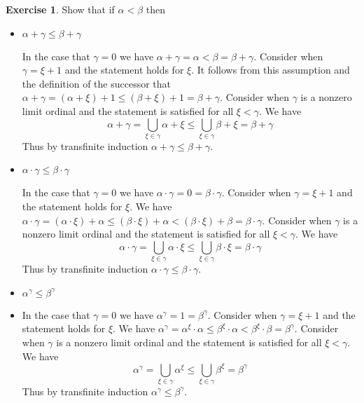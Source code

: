 \documentclass{article}
\theoremstyle{definition}
\newtheorem{exer}{Exercise}[section]
\newlength{\defparindent}
\newenvironment{answer}
    {\begin{mdframed}[backgroundcolor=gray!15, linewidth=0pt] \setlength{\parindent}{\defparindent}}
    {\end{mdframed}}
\begin{document}
\begin{exer}
    Show that if $\alpha < \beta$ then 
    \begin{itemize}
        \item $\alpha + \gamma \le \beta + \gamma$
        \begin{answer}
            In the case that $\gamma = 0$ we have $\alpha + \gamma = \alpha < \beta = \beta + \gamma$. Consider when $\gamma = \xi + 1$ and the statement holds for $\xi$. It follows from this assumption and the definition of the successor that $\alpha + \gamma = (\alpha + \xi) + 1 \le (\beta + \xi) + 1 = \beta + \gamma$. Consider when $\gamma$ is a nonzero limit ordinal and the statement is satisfied for all $\xi < \gamma$. We have 
            \[
                \alpha + \gamma = \bigcup_{\xi \in \gamma} \alpha + \xi 
                \le 
                \bigcup_{\xi \in \gamma} \beta + \xi
                =
                \beta + \gamma
            \]
            Thus by transfinite induction $\alpha + \gamma \le \beta + \gamma$.
        \end{answer}

        \item $\alpha \cdot \gamma \le \beta \cdot \gamma$
        \begin{answer}
            In the case that $\gamma = 0$ we have $\alpha \cdot \gamma = 0 = \beta \cdot \gamma$. Consider when $\gamma = \xi + 1$ and the statement holds for $\xi$. We have $\alpha \cdot \gamma = (\alpha \cdot \xi) + \alpha \le (\beta \cdot \xi) + \alpha < (\beta \cdot \xi) + \beta = \beta \cdot \gamma$. Consider when $\gamma$ is a nonzero limit ordinal and the statement is satisfied for all $\xi < \gamma$. We have 
            \[
                \alpha \cdot \gamma
                =
                \bigcup_{\xi \in \gamma} \alpha \cdot \xi 
                \le 
                \bigcup_{\xi \in \gamma} \beta \cdot \xi
                = 
                \beta \cdot \gamma
            \]
            Thus by transfinite induction $\alpha \cdot \gamma \le \beta \cdot \gamma$.
        \end{answer}

        \item $\alpha^\gamma \le \beta^\gamma$
        \item \begin{answer}
            In the case that $\gamma = 0$ we have $\alpha^\gamma = 1 = \beta^\gamma$. Consider when $\gamma = \xi + 1$ and the statement holds for $\xi$. We have $\alpha^\gamma = \alpha^\xi \cdot \alpha \le \beta^\xi \cdot \alpha < \beta^\xi \cdot \beta = \beta^\gamma$. Consider when $\gamma$ is a nonzero limit ordinal and the statement is satisfied for all $\xi < \gamma$. We have 
            \[
                \alpha^\gamma
                =
                \bigcup_{\xi \in \gamma} \alpha^{\xi}
                \le 
                \bigcup_{\xi \in \gamma} \beta^{\xi}
                =
                \beta^\gamma
            \]
            Thus by transfinite induction $\alpha^\gamma \le \beta^\gamma$.
        \end{answer}
    \end{itemize}
\end{exer}
\end{document}
